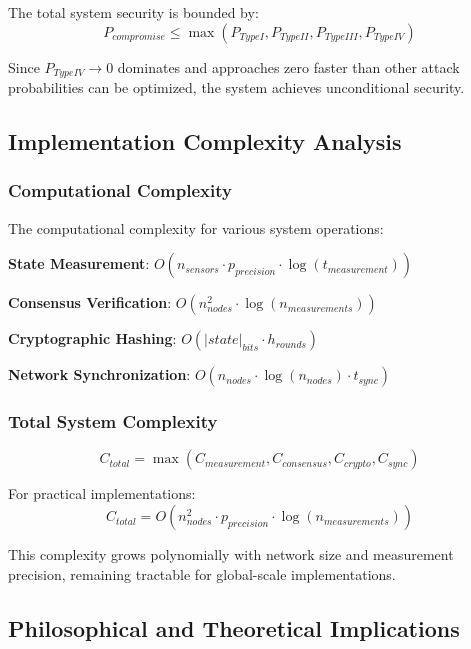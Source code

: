 \documentclass[12pt,a4paper]{article}
\begin{document}
The total system security is bounded by:
\begin{equation}
P_{compromise} \leq \max(P_{Type I}, P_{Type II}, P_{Type III}, P_{Type IV})
\end{equation}

Since $P_{Type IV} \to 0$ dominates and approaches zero faster than other attack probabilities can be optimized, the system achieves unconditional security.

\subsection{Implementation Complexity Analysis}

\subsubsection{Computational Complexity}

The computational complexity for various system operations:

\textbf{State Measurement}: $O(n_{sensors} \cdot p_{precision} \cdot \log(t_{measurement}))$

\textbf{Consensus Verification}: $O(n_{nodes}^2 \cdot \log(n_{measurements}))$

\textbf{Cryptographic Hashing}: $O(|state|_{bits} \cdot h_{rounds})$

\textbf{Network Synchronization}: $O(n_{nodes} \cdot \log(n_{nodes}) \cdot t_{sync})$

\subsubsection{Total System Complexity}

\begin{equation}
C_{total} = \max(C_{measurement}, C_{consensus}, C_{crypto}, C_{sync})
\end{equation}

For practical implementations:
\begin{equation}
C_{total} = O(n_{nodes}^2 \cdot p_{precision} \cdot \log(n_{measurements}))
\end{equation}

This complexity grows polynomially with network size and measurement precision, remaining tractable for global-scale implementations.

\subsection{Philosophical and Theoretical Implications}
\end{document}
